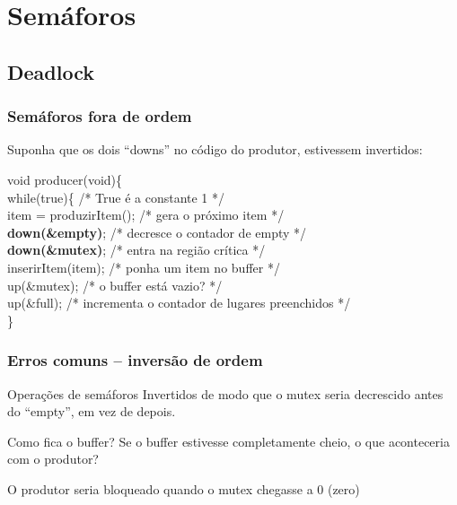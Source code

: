 \documentclass[11pt]{beamer}
\begin{document}
\section{ Semáforos}
\subsection*{ Deadlock}

\begin{frame}\frametitle{ Semáforos fora de ordem}
 Suponha que os dois ``downs'' no código do produtor, estivessem invertidos:\\
\pause

\transblindshorizontal[duration=2, direction=25]
 \begin{algorithm}[H]    
void producer(void)\{ \\
\hspace{0,2 cm}      while(true)\{	/* True é a constante 1 */\\
\hspace{0,5 cm}	item = produzirItem(); 	/* gera o próximo item */\\ 
\hspace{0,5 cm}	\textbf{down(\&empty)};	/* decresce o contador de empty */\\
\hspace{0,5 cm}	\textbf{down(\&mutex)};	/* entra na região crítica */\\
\hspace{0,5 cm}	inserirItem(item);	/* ponha um item no buffer */\\
\hspace{0,5 cm}	up(\&mutex);	 	/* o buffer está vazio? */\\
\hspace{0,5 cm}	up(\&full);		/* incrementa o contador de lugares preenchidos */\\
\hspace{0,2 cm}      \}\\
\end{algorithm}
 
\end{frame}


\begin{frame}\frametitle{ Erros comuns -- inversão de ordem}

\begin{block}{ Operações de semáforos}
  Invertidos de modo que o mutex seria decrescido antes do ``empty'', em vez de depois.
\end{block}


\pause
\begin{exampleblock}{ Como fica o buffer?}
  Se o buffer estivesse completamente cheio, o que aconteceria com o produtor?
\end{exampleblock}

\pause
  O produtor seria bloqueado quando o mutex chegasse a 0 (zero)

\end{frame}
\end{document}
